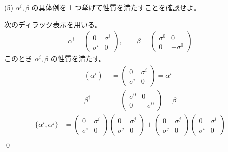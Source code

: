 \documentclass[uplatex,dvipdfmx,a4paper,11pt]{jlreq}
\makeatletter
\numberwithin{equation}{section}
\theoremstyle{definition}
\renewenvironment{proof}[1][\proofname]{\par
  \normalfont
  \topsep6\p@\@plus6\p@ \trivlist
  \item[\hskip\labelsep{\bfseries #1}\@addpunct{\bfseries}]\ignorespaces\quad\par
}{%
  \qed\endtrivlist\@endpefalse
}
\renewcommand\proofname{証明}
\makeatother
\begin{document}
(5) $\alpha^i, \beta$ の具体例を 1 つ挙げて性質を満たすことを確認せよ。
\begin{proof}
  次のディラック表示を用いる。
  \begin{align}
    \alpha^i = \begin{pmatrix}
                 0        & \sigma^i \\
                 \sigma^i & 0
               \end{pmatrix}, \qquad
    \beta = \begin{pmatrix}
              \sigma^0 & 0         \\
              0        & -\sigma^0
            \end{pmatrix}
  \end{align}
  このとき $\alpha^i, \beta$ の性質を満たす。
  \begin{align}
    (\alpha^i)^\dagger & = \begin{pmatrix}
                             0        & \sigma^i \\
                             \sigma^i & 0
                           \end{pmatrix} = \alpha^i \\
    \beta^\dagger      & = \begin{pmatrix}
                             \sigma^0 & 0         \\
                             0        & -\sigma^0
                           \end{pmatrix} = \beta
  \end{align}
  \begin{align}
    \lbrace\alpha^i, \alpha^j\rbrace & = \begin{pmatrix}
                                           0        & \sigma^i \\
                                           \sigma^i & 0
                                         \end{pmatrix}
    \begin{pmatrix}
      0        & \sigma^j \\
      \sigma^j & 0
    \end{pmatrix} +
    \begin{pmatrix}
      0        & \sigma^j \\
      \sigma^j & 0
    \end{pmatrix}
    \begin{pmatrix}
      0        & \sigma^i \\
      \sigma^i & 0
    \end{pmatrix}                                                                                                                          \\

\end{align}
\end{proof}
\end{document}
